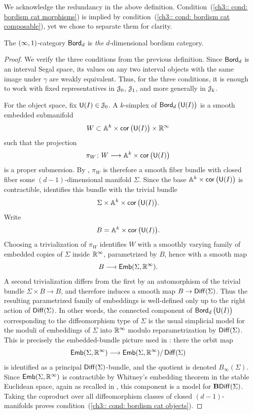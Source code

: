 \begin{observation}
We acknowledge the redundancy in the above definition. Condition~(\ref{ch3:: cond: bordism cat morphisms}) is implied by condition~(\ref{ch3:: cond: bordism cat composable}), yet we chose to separate them for clarity.
\end{observation}

\begin{theorem}\label{ch3:: thm: bordism category characterization}
The $(\operatorname{\infty},1)$-category $\operatorname{\mathsf{Bord}}_{d}$ is \emph{the} $d$-dimensional bordism category.
\end{theorem}

\begin{proof}
    We verify the three conditions from the previous definition. Since $\operatorname{\mathsf{Bord}}_d$ is an interval Segal space, its values on any two interval objects with the same image under $\gamma$ are weakly equivalent. Thus, for the three conditions, it is enough to work with fixed representatives in $\mathcal J_0$, $\mathcal J_1$, and more generally in $\mathcal J_k$.

    For the object space, fix $\mathsf U(I)\in \mathcal J_0$. A $k$-simplex of $\operatorname{\mathsf{Bord}}_d\big(\mathsf U(I)\big)$ is a smooth embedded submanifold
    \[
        W\subset \mathbb A^k\times \operatorname{{\sf cor}}\big(\mathsf U(I)\big)\times \mathbb R^\infty
    \]
    such that the projection
    \[
        \pi_W \colon W\longrightarrow \mathbb A^k\times \operatorname{{\sf cor}}\big(\mathsf U(I)\big)
    \]
    is a proper submersion. By , $\pi_W$ is therefore a smooth fiber bundle with closed fiber some $(d-1)$-dimensional manifold $\Sigma$. Since the base $\mathbb A^k\times \operatorname{{\sf cor}}\big(\mathsf U(I)\big)$ is contractible,  identifies this bundle with the trivial bundle
    \[
        \Sigma\times \mathbb A^k\times \operatorname{{\sf cor}}\big(\mathsf U(I)\big).
    \]
    Write
    \[
        B = \mathbb A^k\times \operatorname{{\sf cor}}\big(\mathsf U(I)\big).
    \]
    Choosing a trivialization of $\pi_W$ identifies $W$ with a smoothly varying family of embedded copies of $\Sigma$ inside $\mathbb R^\infty$, parametrized by $B$, hence with a smooth map
    \[
        B\longrightarrow \operatorname{\mathsf{Emb}}(\Sigma,\mathbb R^\infty).
    \]
    A second trivialization differs from the first by an automorphism of the trivial bundle $\Sigma\times B\to B$, and therefore induces a smooth map $B\to \operatorname{{\sf Diff}}(\Sigma)$. Thus the resulting parametrized family of embeddings is well-defined only up to the right action of $\operatorname{{\sf Diff}}(\Sigma)$. In other words, the connected component of $\operatorname{\mathsf{Bord}}_d\big(\mathsf U(I)\big)$ corresponding to the diffeomorphism type of $\Sigma$ is the usual simplicial model for the moduli of embeddings of $\Sigma$ into $\mathbb R^\infty$ modulo reparametrization by $\operatorname{{\sf Diff}}(\Sigma)$. This is precisely the embedded-bundle picture used in \cite[\S2.1, p.~4]{GMTW09}: there the orbit map
    \[
        \operatorname{\mathsf{Emb}}(\Sigma,\mathbb R^\infty)\longrightarrow \operatorname{\mathsf{Emb}}(\Sigma,\mathbb R^\infty)/\operatorname{{\sf Diff}}(\Sigma)
    \]
    is identified as a principal $\operatorname{{\sf Diff}}(\Sigma)$-bundle, and the quotient is denoted $B_\infty(\Sigma)$. Since $\operatorname{\mathsf{Emb}}(\Sigma,\mathbb R^\infty)$ is contractible by Whitney's embedding theorem in the stable Euclidean space, again as recalled in \cite[\S2.1, p.~4]{GMTW09}, this component is a model for $\mathbf{B}\!\operatorname{{\sf Diff}}(\Sigma)$. Taking the coproduct over all diffeomorphism classes of closed $(d-1)$-manifolds proves condition~(\ref{ch3:: cond: bordism cat objects}).


\end{proof}
